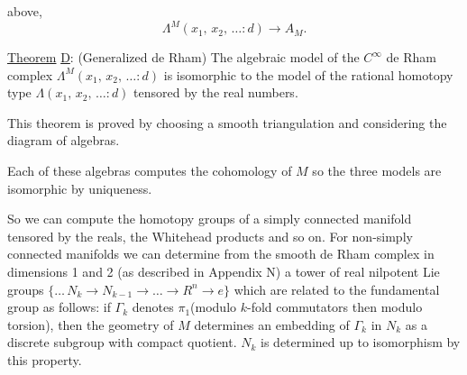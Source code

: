 above,
\[
\Lambda^{M}(x_{1},\,x_{2},\,\ldots : d)\to A_{M}.
\]

\uline{Theorem} \uline{D}: \quad (Generalized de Rham) The algebraic model of the \(C^{\infty}\) de Rham complex \(\Lambda^{M}(x_{1},\,x_{2},\,\ldots : d)\) is isomorphic to the model of the rational homotopy type \(\Lambda(x_{1},\,x_{2},\,\ldots : d)\) tensored by the real numbers.

This theorem is proved by choosing a smooth triangulation and considering the diagram of algebras.


Each of these algebras computes the cohomology of \(M\) so the three models are isomorphic by uniqueness.

So we can compute the homotopy groups of a simply connected manifold tensored by the reals, the Whitehead products and so on. For non-simply connected manifolds we can determine from the smooth de Rham complex in dimensions 1 and 2 (as described in Appendix N) a tower of real nilpotent Lie groups \(\{\ldots\,N_{k}\to N_{k-1}\to\ldots\to R^{n}\to e\}\) which are related to the fundamental group as follows: if \(\Gamma_{k}\) denotes \(\pi_{1}\)(modulo \(k\)-fold commutators then modulo torsion), then the geometry of \(M\) determines an embedding of \(\Gamma_{k}\) in \(N_{k}\) as a discrete subgroup with compact quotient. \(N_{k}\) is determined up to isomorphism by this property.
